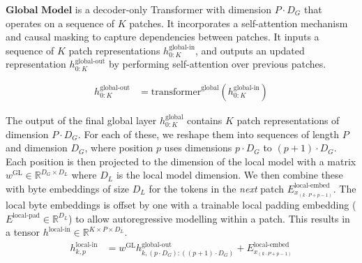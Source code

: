 \documentclass{article}
\newcommand{\h}[1]{h^\text{#1}}%
\newcommand{\inR}[1]{\in\mathbb{R}^{#1}}
\newcommand{\transformer}[2]{\text{transformer}^{\text{#1}}(#2)}
\theoremstyle{plain}
\theoremstyle{definition}
\theoremstyle{remark}
\begin{document}

$\textbf{Global Model}$ is a decoder-only Transformer %
with dimension $P\cdot D_G$ that operates on a sequence of $K$ patches. It incorporates a self-attention mechanism and causal masking to capture dependencies between patches. 
It inputs a sequence of $K$ patch representations $\h{global-in}_{0:K}$, and outputs an updated representation $\h{global-out}_{0:K}$ by performing self-attention over previous patches.

\begin{align}
\h{global-out}_{0:K} &= \transformer{global}{\h{global-in}_{0:K}} %
\end{align}

The output of the final global layer $\h{global}_{0:K}$ contains $K$ patch representations of dimension $P\cdot D_G$. For each of these, we reshape them into sequences of length $P$ and dimension $D_G$, where position $p$ uses dimensions $p \cdot D_G$ to $(p+1) \cdot D_G$. Each position is then projected to the dimension of the local model with a matrix $w^{\text{GL}}\inR{D_G\times D_L}$ where $D_L$ is the local model dimension.
We then combine these with byte embeddings of size $D_L$ for the tokens in the \emph{next} patch $E^\text{local-embed}_{x_{(k\cdot P + p - 1)}}$. 
The local byte embeddings is offset by one with a trainable local padding embedding ($E^{\text{local-pad}} \inR{D_L}$) to allow autoregressive modelling within a patch. This results in a tensor $\h{local-in}\inR{K\times P \times D_L}$.
\begin{align}
\h{local-in}_{k,p} &= w^{\text{GL}}\h{global-out}_{k,(p\cdot D_G):((p+1)\cdot D_G)} + E^\text{local-embed}_{x_{(k\cdot P + p - 1)}}%
\end{align}
\end{document}
